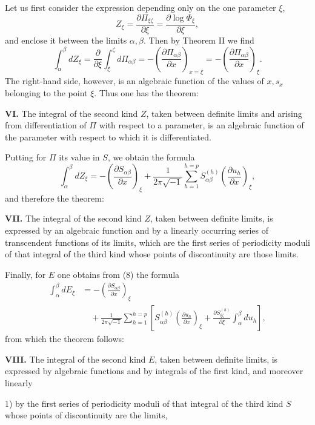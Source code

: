 \documentclass[10pt]{article}
\begin{document}
Let us first consider the expression depending only on the one parameter \(\xi\),
\[
\tag{9}
Z_\xi=\frac{\partial \Pi_{\xi\zeta}}{\partial \xi}=\frac{\partial \log\Phi_\xi}{\partial \xi},
\]
and enclose it between the limits \(\alpha,\beta\). Then by Theorem II we find
\[
\tag{10}
\int_{\alpha}^{\beta}dZ_\xi
=\frac{\partial}{\partial \xi}\int_{\xi}^{\zeta}d\Pi_{\alpha\beta}
=-\left(\frac{\partial\Pi_{\alpha\beta}}{\partial x}\right)_{x=\xi}
=-\left(\frac{\partial\Pi_{\alpha\beta}}{\partial x}\right)_\xi.
\]
The right-hand side, however, is an algebraic function of the values of \(x,s_x\) belonging to the point \(\xi\). Thus one has the theorem:

\noindent\textbf{VI.} The integral of the second kind \(Z\), taken between definite limits and arising from differentiation of \(\Pi\) with respect to a parameter, is an algebraic function of the parameter with respect to which it is differentiated.

Putting for \(\Pi\) its value in \(S\), we obtain the formula
\[
\tag{11}
\int_{\alpha}^{\beta}dZ_\xi
=-\left(\frac{\partial S_{\alpha\beta}}{\partial x}\right)_\xi
+\frac{1}{2\pi\sqrt{-1}}\sum_{h=1}^{h=p}S_{\alpha\beta}^{(h)}
\left(\frac{\partial u_h}{\partial x}\right)_\xi,
\]
and therefore the theorem:

\noindent\textbf{VII.} The integral of the second kind \(Z\), taken between definite limits, is expressed by an algebraic function and by a linearly occurring series of transcendent functions of its limits, which are the first series of periodicity moduli of that integral of the third kind whose points of discontinuity are those limits.

Finally, for \(E\) one obtains from (8) the formula
\[
\tag{12}
\begin{aligned}
\int_{\alpha}^{\beta}dE_\xi
&=-\left(\frac{\partial S_{\alpha\beta}}{\partial x}\right)_\xi\\
&\quad+\frac{1}{2\pi\sqrt{-1}}\sum_{h=1}^{h=p}\left[
S_{\alpha\beta}^{(h)}\left(\frac{\partial u_h}{\partial x}\right)_\xi
+\frac{\partial S_{\xi\zeta}^{(h)}}{\partial \xi}\int_{\alpha}^{\beta}du_h\right],
\end{aligned}
\]
from which the theorem follows:

\noindent\textbf{VIII.} The integral of the second kind \(E\), taken between definite limits, is expressed by algebraic functions and by integrals of the first kind, and moreover linearly

1) by the first series of periodicity moduli of that integral of the third kind \(S\) whose points of discontinuity are the limits,
\end{document}
